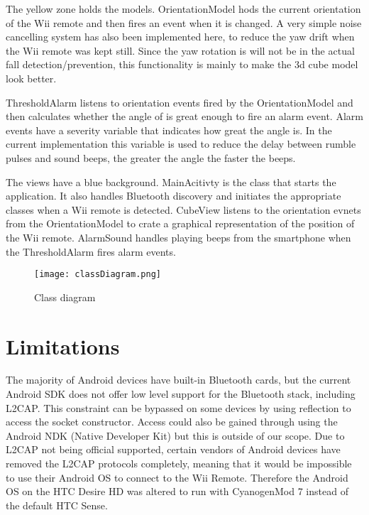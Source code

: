 The yellow zone holds the models. OrientationModel hods the current orientation of the Wii remote and then fires an event when it is changed. A very simple noise cancelling system has also been implemented here, to reduce the yaw drift when the Wii remote was kept still. Since the yaw rotation is will not be in the actual fall detection/prevention, this functionality is mainly to make the 3d cube model look better.

ThresholdAlarm listens to orientation events fired by the OrientationModel and then calculates whether the angle of is great enough to fire an alarm event. Alarm events have a severity variable that indicates how great the angle is. In the current implementation this variable is used to reduce the delay between rumble pulses and sound beeps, the greater the angle the faster the beeps.

The views have a blue background. MainAcitivty is the class that starts the application. It also handles Bluetooth discovery and initiates the appropriate classes when a Wii remote is detected. CubeView listens to the orientation evnets from the OrientationModel to crate a graphical representation of the position of the Wii remote. AlarmSound handles playing beeps from the smartphone when the ThresholdAlarm fires alarm events. 

\begin{figure}[h!]
	\centering
	\texttt{[image: classDiagram.png]}
	\caption{\footnotesize Class diagram}
	\label{fig:classDiagram}
\end{figure}

\section{Limitations}
The majority of Android devices have built-in Bluetooth cards, but the current Android SDK does not offer low level support for the Bluetooth stack, including L2CAP. This constraint can be bypassed on some devices by using reflection to access the socket constructor\cite{l2capHtc}. Access could also be gained through using the Android NDK (Native Developer Kit) but this is outside of our scope. Due to L2CAP not being official supported, certain vendors of Android devices have removed the L2CAP protocols completely, meaning that it would be impossible to use their Android OS to connect to the Wii Remote. Therefore the Android OS on the HTC Desire HD was altered to run with CyanogenMod 7 instead of the default HTC Sense.


